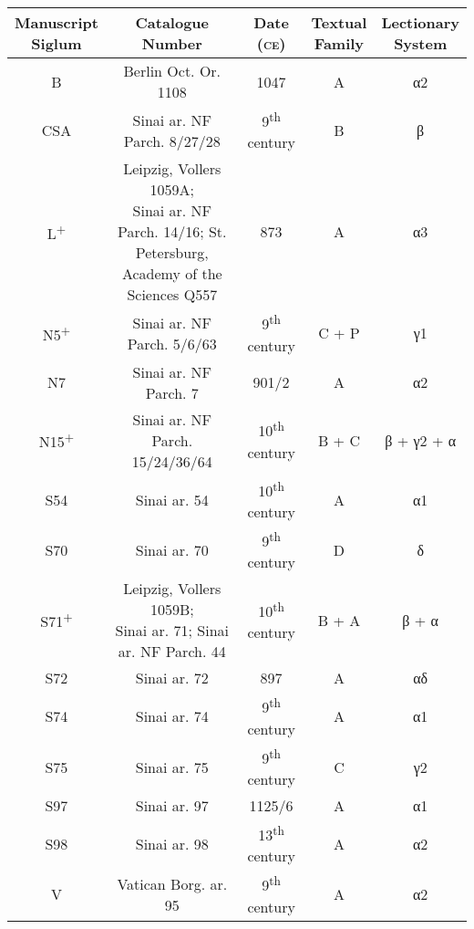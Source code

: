 \begin{tabular}{c c c c c} 
\toprule
 \thead{Manuscript\\Siglum} & \thead{Catalogue\\Number} & \thead{Date\\(\textsc{ce})} & \thead{Textual\\Family} & \thead{Lectionary\\System} \\
\midrule

 B & Berlin Oct. Or. 1108 & 1047 & A & α2 \\
 CSA & Sinai ar. NF Parch. 8/27/28 & 9\textsuperscript{th} century & B & β \\
 L\textsuperscript{+} & \makecell{Leipzig, Vollers 1059A; \\ Sinai ar. NF Parch. 14/16; St. Petersburg, Academy of the Sciences Q557} & 873 & A & α3 \\
 N5\textsuperscript{+} & Sinai ar. NF Parch. 5/6/63 & 9\textsuperscript{th} century & C + P & γ1 \\
 N7 & Sinai ar. NF Parch. 7 & 901\slash 2 & A & α2 \\
 N15\textsuperscript{+} & Sinai ar. NF Parch. 15/24/36/64 & 10\textsuperscript{th} century & B + C & β + γ2 + α \\
 S54 & Sinai ar. 54 & 10\textsuperscript{th} century & A & α1 \\
 S70 & Sinai ar. 70 & 9\textsuperscript{th} century & D & δ \\
 S71\textsuperscript{+} & \makecell{Leipzig, Vollers 1059B; \\ Sinai ar. 71; Sinai ar. NF Parch. 44} & 10\textsuperscript{th} century & B + A & β + α \\
 S72 & Sinai ar. 72 & 897 & A & αδ \\
 S74 & Sinai ar. 74 & 9\textsuperscript{th} century & A & α1 \\
 S75 & Sinai ar. 75 & 9\textsuperscript{th} century & C & γ2 \\
 S97 & Sinai ar. 97 & 1125\slash 6 & A & α1 \\
 S98 & Sinai ar. 98 & 13\textsuperscript{th} century & A & α2 \\
 V & Vatican Borg. ar. 95 & 9\textsuperscript{th} century & A & α2 \\
\bottomrule

\end{tabular}

